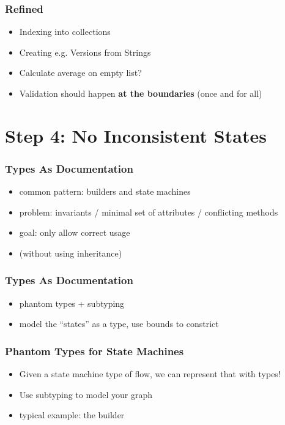 \documentclass{beamer}
\begin{document}
\begin{frame}
  \frametitle{Refined}
  \begin{itemize}
  \item Indexing into collections
  \item Creating e.g. Versions from Strings
  \item Calculate average on empty list?
  \item Validation should happen \textbf{at the boundaries} (once and
    for all)
  \end{itemize}
\end{frame}

\section{Step 4: No Inconsistent States}

\begin{frame}
  \frametitle{Types As Documentation}
  \begin{itemize}
  \item common pattern: builders and state machines
  \item problem: invariants / minimal set of attributes / conflicting
    methods
  \item goal: only allow correct usage
  \item (without using inheritance)
  \end{itemize}
\end{frame}

\begin{frame}
  \frametitle{Types As Documentation}
  \begin{itemize}
  \item phantom types + subtyping
  \item model the ``states'' as a type, use bounds to constrict
  \end{itemize}
\end{frame}

\begin{frame}
  \frametitle{Phantom Types for State Machines}
  \begin{itemize}
  \item Given a state machine type of flow, we can represent that with
    types!
  \item Use subtyping to model your graph
  \item typical example: the builder
  \end{itemize}
\end{frame}
\end{document}
